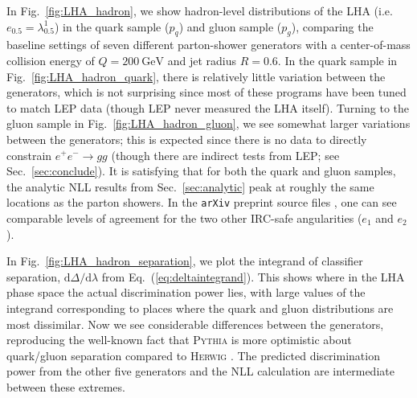 \documentclass[11pt,letterpaper]{article}
\newcommand{\GeV}{\text{GeV}}
\DeclareRobustCommand{\Sec}[1]{Sec.~\ref{#1}}
\DeclareRobustCommand{\Fig}[1]{Fig.~\ref{#1}}
\DeclareRobustCommand{\Eq}[1]{Eq.~(\ref{#1})}
\begin{document}
In \Fig{fig:LHA_hadron}, we show hadron-level distributions of the LHA (i.e.~$e_{0.5} = \lambda_{0.5}^1$) in the quark sample ($p_q$) and gluon sample ($p_g$), comparing the baseline settings of seven different parton-shower generators with a center-of-mass collision energy of $Q = 200~\GeV$ and jet radius $R = 0.6$. In the quark sample in \Fig{fig:LHA_hadron_quark}, there is relatively little variation between the generators, which is not surprising since most of these programs have been tuned to match LEP data (though LEP never measured the LHA itself).  Turning to the gluon sample in \Fig{fig:LHA_hadron_gluon}, we see somewhat larger variations between the generators; this is expected since there is no data to directly constrain $e^+ e^- \to gg$ (though there are indirect tests from LEP; see \Sec{sec:conclude}).    It is satisfying that for both the quark and gluon samples, the analytic NLL results from \Sec{sec:analytic} peak at roughly the same locations as the parton showers.  In the \texttt{arXiv} preprint source files \cite{ArXivSource}, one can see comparable levels of agreement for the two other IRC-safe angularities ($e_1$ and $e_2$).

In \Fig{fig:LHA_hadron_separation}, we plot the integrand of classifier separation, $\text{d} \Delta / \text{d} \lambda$ from \Eq{eq:deltaintegrand}. This shows where in the LHA phase space the actual discrimination power lies, with large values of the integrand
corresponding to places where the quark and gluon distributions are
most dissimilar.  Now we see considerable differences between the
generators, reproducing the well-known fact that \textsc{Pythia} is
more optimistic about quark/gluon separation compared to
\textsc{Herwig} \cite{Aad:2014gea}.  The predicted discrimination power from the other five generators and the NLL calculation are intermediate between these
extremes.
\end{document}
